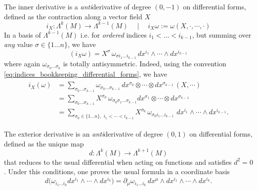 \begin{mytheorem}
The inner derivative is a \emph{anti}derivative of degree $(0,-1)$ on differential forms, defined as the contraction along a vector field $X$
\begin{equation}
    i_X: \Lambda^k (M) \to \Lambda^{k-1} (M)\quad  \mid\quad  i_X \omega := \omega (X, \cdot, \cdots, \cdot) 
\end{equation}
In a basis of $\Lambda^{k-1}(M)$ i.e. for \emph{ordered} indices $i_1< \dots <i_{k-1}$, but summing over \emph{any} value $\sigma\in \{1\dots n\}$, we have
\begin{equation}\label{eq:interior_derivative_basis_expr}
   (i_X \omega) = X^{\sigma}\, \omega_{\sigma i_1 \dots i_{k-1}} \, dx^{i_1} \wedge \cdots \wedge dx^{i_{k-1}}
\end{equation} 
where again $\omega_{\sigma_0 \dots \sigma_k}$ is totally antisymmetric.
Indeed, using the convention \eqref{eq:indices_bookkeeping_differential_forms}, we have
\begin{align}
\begin{aligned}
    i_X(\omega) &= \sum_{\sigma_0 \dots \sigma_{k-1}} \omega_{\sigma_0 \dots \sigma_{k-1}}\, dx^{\sigma_0}\otimes \cdots \otimes dx^{\sigma_{k-1}}\, (X, \cdots)
    \\
    &= \sum_{\sigma_0 \dots \sigma_{k-1}} X^{\sigma_0} \, \omega_{\sigma_0 \sigma_1 \dots \sigma_{k-1}}dx^{\sigma_1}\otimes \cdots \otimes dx^{\sigma_{k-1}}
    \\
    &= \sum_{\sigma_0 \in\{1\dots n\},\,\,i_1 < \cdots < i_{k-1}} X^{\sigma_0} \, \omega_{\sigma_0 i_1 \dots i_{k-1}}\,\,dx^{i_1}\wedge\cdots \wedge dx^{i_{k-1}}.
\end{aligned}
\end{align}
\end{mytheorem}


\begin{mytheorem}
The exterior derivative is an \emph{anti}derivative of degree $(0,1)$ on differential forms, defined as the unique map
\begin{equation}
    d: \Lambda^k (M) \to \Lambda^{k+1} (M)
\end{equation}
that reduces to the usual differential when acting on functions and satisfies $d^2 = 0$.
Under this conditions, one proves the usual formula in a coordinate basis
\begin{equation}\label{eq:exterior_deriv_basis_expr}
    d \Big(\omega_{i_1 \dots i_k} dx^{i_1} \wedge \cdots \wedge dx^{i_k}\Big) = \partial_\mu \omega_{i_1 \dots i_k} \, dx^{\mu} \wedge dx^{i_1} \wedge \cdots \wedge dx^{i_k}.
\end{equation}
\end{mytheorem}


